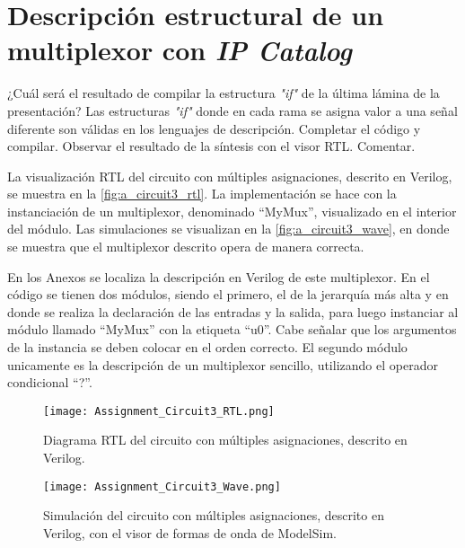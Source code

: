 \section{Descripción estructural de un multiplexor con \textit{IP Catalog} \label{sec:s2}}

\begin{center}
	\begin{minipage}{12cm}
		\begin{tcolorbox}[title=Actividad 3]
			¿Cuál será el resultado de compilar la estructura \textit{"if"} de la última lámina de la presentación? Las estructuras \textit{"if"} donde en cada rama se asigna valor a una señal diferente son válidas en los lenguajes de descripción. Completar el código y compilar. Observar el resultado de la síntesis con el visor RTL. Comentar.
		\end{tcolorbox}	
	\end{minipage}
\end{center}

La visualización RTL del circuito con múltiples asignaciones, descrito en Verilog, se muestra en la \autoref{fig:a_circuit3_rtl}. La implementación se hace con la instanciación de un multiplexor, denominado ``MyMux'', visualizado en el interior del módulo. Las simulaciones se visualizan en la \autoref{fig:a_circuit3_wave}, en donde se muestra que el multiplexor descrito opera de manera correcta.

En los Anexos se localiza la descripción en Verilog de este multiplexor. En el código se tienen dos módulos, siendo el primero, el de la jerarquía más alta y en donde se realiza la declaración de las entradas y la salida, para luego instanciar al módulo llamado ``MyMux'' con la etiqueta ``u0''. Cabe señalar que los argumentos de la instancia se deben colocar en el orden correcto. El segundo módulo unicamente es la descripción de un multiplexor sencillo, utilizando el operador condicional ``?''.

\begin{figure}[ht]
	\centering
	\texttt{[image: Assignment\_Circuit3\_RTL.png]}
	\caption{Diagrama RTL del circuito con múltiples asignaciones, descrito en Verilog. \label{fig:a_circuit3_rtl}}
\end{figure}

\begin{figure}[ht]
	\centering
	\texttt{[image: Assignment\_Circuit3\_Wave.png]}
	\caption{Simulación del circuito con múltiples asignaciones, descrito en Verilog, con el visor de formas de onda de ModelSim. \label{fig:a_circuit3_wave}}
\end{figure}